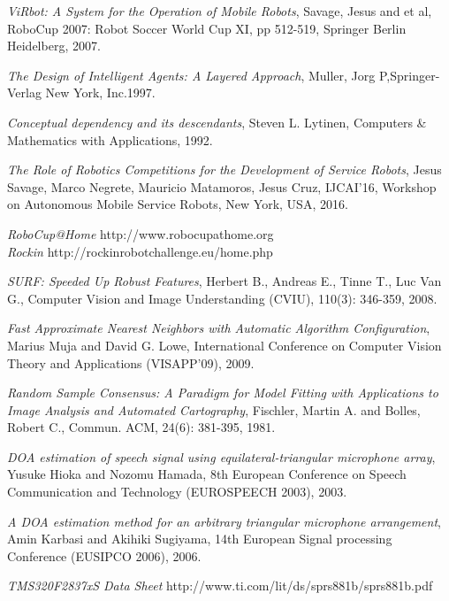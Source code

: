 \documentclass{llncs}
\begin{document}
\begin{thebibliography}{1}


{\em ViRbot: A System for the Operation of Mobile Robots}, Savage, Jesus and et al, RoboCup 2007: Robot Soccer World Cup XI,
pp 512-519, Springer Berlin Heidelberg, 2007.

{\em The Design of Intelligent Agents: A Layered Approach}, Muller, Jorg P,Springer-Verlag New York, Inc.1997.

{\em Conceptual dependency and its descendants}, Steven L. Lytinen, Computers \& Mathematics with Applications, 1992.

{\em The Role of Robotics Competitions for the Development of Service Robots}, 
 Jesus Savage, Marco Negrete, Mauricio Matamoros, Jesus Cruz,
IJCAI'16, Workshop on Autonomous Mobile Service Robots, New York, USA, 2016.

{\em RoboCup@Home} http://www.robocupathome.org
\\
{\em Rockin} http://rockinrobotchallenge.eu/home.php

{\em SURF: Speeded Up Robust Features}, Herbert B., Andreas E., Tinne T., Luc Van G., Computer Vision and Image Understanding (CVIU), 110(3): 346-359, 2008.

{\em Fast Approximate Nearest Neighbors with Automatic Algorithm Configuration}, Marius Muja and David G. Lowe, International Conference on Computer Vision Theory and Applications (VISAPP'09), 2009.

{\em  Random Sample Consensus: A Paradigm for Model Fitting with Applications to Image Analysis and Automated Cartography}, Fischler, Martin A. and Bolles, Robert C., Commun. ACM, 24(6): 381-395, 1981.

\textit{DOA estimation of speech signal using equilateral-triangular microphone array}, Yusuke Hioka and Nozomu Hamada, 8th European Conference on Speech Communication and Technology (EUROSPEECH 2003), 2003.

\textit{A DOA estimation method for an arbitrary triangular microphone arrangement}, Amin Karbasi and Akihiki Sugiyama, 14th European Signal processing Conference (EUSIPCO 2006), 2006.

{\em TMS320F2837xS Data Sheet} http://www.ti.com/lit/ds/sprs881b/sprs881b.pdf


\end{thebibliography}
\end{document}
